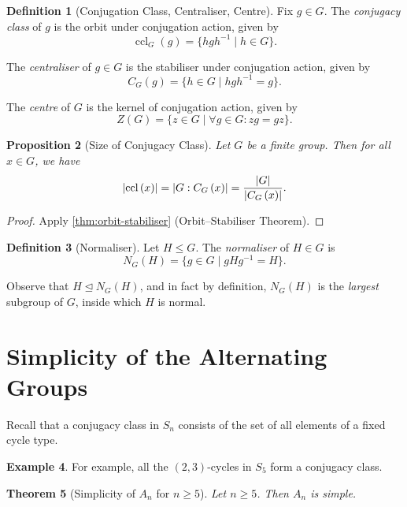 \documentclass{article}
\newtheorem{theorem}{Theorem}[section]
\newtheorem{proposition}[theorem]{Proposition}
\theoremstyle{definition}
\newtheorem{definition}[theorem]{Definition}
\newtheorem{example}[theorem]{Example}
\theoremstyle{remark}
\DeclarePairedDelimiter{\abs}{\lvert}{\rvert}
\newcommand{\pqty}[1]{\left(#1\right)}
\newcommand{\set}[2]{\{#1\mid #2\}}
\newcommand{\inverse}{^{-1}}
\newcommand{\normalsub}{\trianglelefteq}
\newcommand{\subgroup}{\leq}
\newcommand{\ccl}{\operatorname{ccl}}
\begin{document}
\begin{definition}[Conjugation Class, Centraliser, Centre]
    \label{def:ccl-centraliser-centre}%
    Fix \(g \in G\). The \emph{conjugacy class} of \(g\) is the orbit under conjugation action, given by
    \[
        \ccl_G\pqty{g} = \set{hgh\inverse}{h \in G}.
    \]

    The \emph{centraliser} of \(g \in G\) is the stabiliser under conjugation action, given by
    \[
        C_G\pqty{g} = \set{h \in G}{h g h\inverse = g}.
    \]

    The \emph{centre} of \(G\) is the kernel of conjugation action, given by
    \[
        Z\pqty{G} = \set{z \in G}{\forall g \in G: zg = gz}.
    \]
\end{definition}

\begin{proposition}[Size of Conjugacy Class]
    \label{prop:size-conjugacy-class}%
    Let \(G\) be a finite group. Then for all \(x \in G\), we have
    \[
        \abs{\ccl\pqty{x}} = \abs{G : C_G\pqty{x}} = \frac{\abs{G}}{\abs{C_G\pqty{x}}}.
    \]
\end{proposition}

\begin{proof}
    Apply \autoref{thm:orbit-stabiliser} (Orbit--Stabiliser Theorem).
\end{proof}

\begin{definition}[Normaliser]
    \label{def:normaliser}%
    Let \(H \subgroup G\). The \emph{normaliser} of \(H \in G\) is
    \[
        N_G \pqty{H} = \set{g \in G}{gHg\inverse = H}.
    \]
\end{definition}

Observe that \(H \normalsub N_G\pqty{H}\), and in fact by definition, \(N_G\pqty{H}\) is the \emph{largest} subgroup of \(G\), inside which \(H\) is normal.

\section{Simplicity of the Alternating Groups}

Recall that a conjugacy class in \(S_n\) consists of the set of all elements of a fixed cycle type.

\begin{example}
    For example, all the \(\pqty{2, 3}\)-cycles in \(S_5\) form a conjugacy class.
\end{example}

\begin{theorem}[Simplicity of \(A_n\) for \(n \geq 5\)]
    \label{thm:an-simple}%
    Let \(n \geq 5\). Then \(A_n\) is simple.
\end{theorem}
\end{document}
